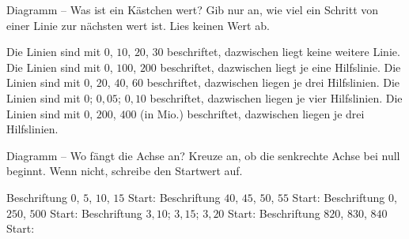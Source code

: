 \setcounter{aufgabe}{13}

\begin{aufgabe}{Diagramm -- Was ist ein Kästchen wert? Gib nur an, wie viel ein Schritt von einer Linie zur nächsten wert ist. Lies keinen Wert ab.}
\begin{teile}
\teil Die Linien sind mit $0$, $10$, $20$, $30$ beschriftet, dazwischen liegt keine weitere Linie. \leerfeld
\teil Die Linien sind mit $0$, $100$, $200$ beschriftet, dazwischen liegt je eine Hilfslinie. \leerfeld
\teil Die Linien sind mit $0$, $20$, $40$, $60$ beschriftet, dazwischen liegen je drei Hilfslinien. \leerfeld
\teil Die Linien sind mit $0$; $0{,}05$; $0{,}10$ beschriftet, dazwischen liegen je vier Hilfslinien. \leerfeld
\teil Die Linien sind mit $0$, $200$, $400$ (in Mio.) beschriftet, dazwischen liegen je drei Hilfslinien. \leerfeld
\end{teile}
\end{aufgabe}

\begin{aufgabe}{Diagramm -- Wo fängt die Achse an? Kreuze an, ob die senkrechte Achse bei null beginnt. Wenn nicht, schreibe den Startwert auf.}
\begin{teile}
\teil Beschriftung $0$, $5$, $10$, $15$ \hfill \janein \quad Start: \leerfeld
\teil Beschriftung $40$, $45$, $50$, $55$ \hfill \janein \quad Start: \leerfeld
\teil Beschriftung $0$, $250$, $500$ \hfill \janein \quad Start: \leerfeld
\teil Beschriftung $3{,}10$; $3{,}15$; $3{,}20$ \hfill \janein \quad Start: \leerfeld
\teil Beschriftung $820$, $830$, $840$ \hfill \janein \quad Start: \leerfeld
\end{teile}
\end{aufgabe}

